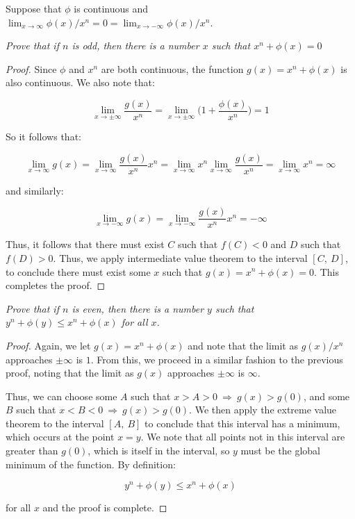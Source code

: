 \documentclass[10pt, oneside]{amsart}
\newenvironment{problem}[2][Problem]{\begin{trivlist}
\item[\hskip \labelsep {\bfseries #1}\hskip \labelsep {\bfseries #2.}]}{\end{trivlist}}
\begin{document}
    \begin{problem}{7}
      Suppose that $\phi$ is continuous and $\lim_{x \to \infty} \phi(x)/x^n = 0 = \lim_{x \to -\infty} \phi(x)/x^n$.
    \end{problem}

    \textit{Prove that if $n$ is odd, then there is a number $x$ such that $x^n + \phi(x) = 0$}

    \begin{proof}
      Since $\phi$ and $x^n$ are both continuous, the function $g(x) = x^n + \phi(x)$ is also continuous. We also note that:

      $$\lim_{x \to \pm \infty} \frac{g(x)}{x^n} = \lim_{x \to \pm \infty} \big(1 + \frac{\phi(x)}{x^n} \big) = 1$$

      So it follows that:

      $$\lim_{x \to \infty} g(x) = \lim_{x \to \infty} \frac{g(x)}{x^n} x^n = \lim_{x \to \infty} x^n \lim_{x \to \infty} \frac{g(x)}{x^n} = \lim_{x \to \infty} x^n = \infty$$

      and similarly:

      $$\lim_{x \to -\infty} g(x) = \lim_{x \to -\infty} \frac{g(x)}{x^n} x^n = -\infty$$

      Thus, it follows that there must exist $C$ such that $f(C) < 0$ and $D$ such that $f(D) > 0$. Thus, we apply intermediate value theorem to the interval
      $[C, \ D]$, to conclude there must exist some $x$ such that $g(x) = x^n + \phi(x) = 0$. This completes the proof.
    \end{proof}

    \textit{Prove that if $n$ is even, then there is a number $y$ such that $y^n + \phi(y) \leq x^n + \phi(x)$ for all $x$.}

    \begin{proof}
      Again, we let $g(x) = x^n + \phi(x)$ and note that the limit as $g(x)/x^n$ approaches $\pm \infty$ is $1$. From this, we proceed in a similar
      fashion to the previous proof, noting that the limit as $g(x)$ approaches $\pm \infty$ is $\infty$.
      \newline

      Thus, we can choose some
      $A$ such that $x > A > 0 \ \Rightarrow \ g(x) > g(0)$, and some $B$ such that $x < B < 0 \ \Rightarrow \ g(x) > g(0)$. We then apply the extreme value
      theorem to the interval $[A, \ B]$ to conclude that this interval has a minimum, which occurs at the point $x = y$. We note that all points not in this interval
      are greater than $g(0)$, which is itself in the interval, so $y$ must be the global minimum of the function. By definition:

      $$y^n + \phi(y) \leq x^n + \phi(x)$$

      for all $x$ and the proof is complete.
    \end{proof}
\end{document}

